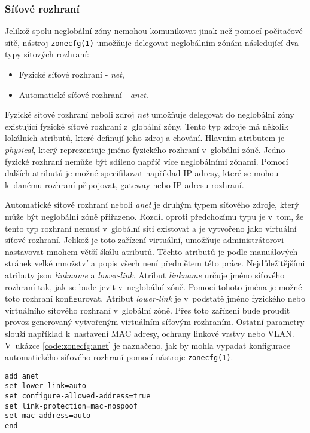 \subsubsection{Síťové rozhraní}
\label{chapter:zones:configuration:resources:network}
Jelikož spolu neglobální zóny nemohou komunikovat jinak než pomocí počítačové sítě, nástroj \verb|zonecfg(1)| umožňuje delegovat
neglobálním zónám následující dva typy sítových rozhraní:
\begin{itemize}
 \item Fyzické síťové rozhraní - \textit{net},
 \item Automatické síťové rozhraní - \textit{anet}.
\end{itemize}
Fyzické síťové rozhraní neboli zdroj \textit{net} umožňuje delegovat do neglobální zóny existující fyzické síťové rozhraní
z~globální zóny. Tento typ zdroje má několik lokálních atributů, které definují jeho zdroj a chování. Hlavním atributem je
\textit{physical}, který reprezentuje jméno fyzického rozhraní v~globální zóně. Jedno fyzické rozhraní nemůže být sdíleno
napříč více neglobálními zónami. Pomocí dalších atributů je možné specifikovat například IP adresy, které se mohou k~danému 
rozhraní připojovat, gateway nebo IP adresu rozhraní. 

Automatické síťové rozhraní neboli \textit{anet} je druhým typem síťového zdroje, který může být neglobální zóně přiřazeno. Rozdíl
oproti předchozímu typu je v~tom, že tento typ rozhraní nemusí v~globální síti existovat a je vytvořeno jako virtuální síťové
rozhraní. Jelikož je toto zařízení virtuální, umožňuje administrátorovi nastavovat mnohem větší škálu atributů. Těchto
atributů je podle manuálových stránek \cite{oracle:manpages:zonecfg} velké množství a popis všech není předmětem této práce.
Nejdůležitějšími atributy jsou \textit{linkname} a \textit{lower-link}. Atribut \textit{linkname} určuje jméno
síťového rozhraní tak, jak se bude jevit v~neglobální zóně. Pomocí tohoto jména je možné toto rozhraní konfigurovat.
Atribut \textit{lower-link} je v~podstatě jméno fyzického nebo virtuálního síťového rozhraní v~globální zóně.
Přes toto zařízení bude proudit provoz generovaný vytvořeným virtuálním síťovým rozhraním.
Ostatní parametry slouží například k~nastavení MAC adresy, ochrany linkové vrstvy nebo VLAN. V~ukázce 
\ref{code:zonecfg:anet} je naznačeno, jak by mohla vypadat konfigurace automatického síťového rozhraní pomocí nástroje 
\verb|zonecfg(1)|.
\begin{lstlisting}[caption={Konfigurace síťového rozhraní}, float, label={code:zonecfg:anet}]
add anet
set lower-link=auto
set configure-allowed-address=true
set link-protection=mac-nospoof
set mac-address=auto
end
\end{lstlisting}
